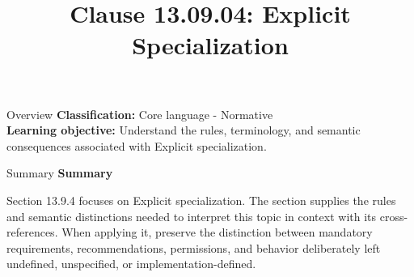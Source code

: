 \documentclass[10pt,letterpaper]{article}
\title{Clause 13.09.04: Explicit Specialization}
\author{}
\date{}
\begin{document}
\maketitle
\begin{CornellOverviewBox}{Overview}
\textbf{Classification:} Core language - Normative\\[2pt]
\textbf{Learning objective:} Understand the rules, terminology, and semantic consequences associated with Explicit specialization.
\end{CornellOverviewBox}\begin{CornellSummaryBox}{Summary}
{\sffamily\bfseries\color{Accent} Summary}\par\vspace{3pt}Section 13.9.4 focuses on Explicit specialization. The section supplies the rules and semantic distinctions needed to interpret this topic in context with its cross-references. When applying it, preserve the distinction between mandatory requirements, recommendations, permissions, and behavior deliberately left undefined, unspecified, or implementation-defined.
\end{CornellSummaryBox}
\end{document}

